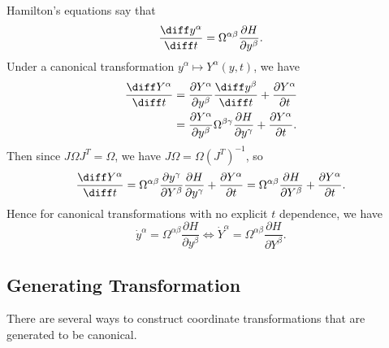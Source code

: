 \documentclass[12pt]{article}
\begin{document}
Hamilton's equations say that
\[
	\frac{\diff y^\alpha}{\diff t} = \Omega^{\alpha \beta} \frac{\partial H}{\partial y^{\beta}}.
\]
Under a canonical transformation $y^\alpha \mapsto Y^{\alpha}(y, t)$, we have
\begin{align*}
	\frac{\diff Y^{\alpha}}{\diff t} &= \frac{\partial Y^{\alpha}}{\partial y^{\beta}} \frac{\diff y^{\beta}}{\diff t} + \frac{\partial Y^{\alpha}}{\partial t} \\
					 &= \frac{\partial Y^{\alpha}}{\partial y^{\beta}} \Omega^{\beta \gamma} \frac{\partial H}{\partial y^{\gamma}} + \frac{\partial Y^{\alpha}}{\partial t}.
\end{align*}
Then since $J \Omega J^{T} = \Omega$, we have $J \Omega = \Omega (J^{T})^{-1}$, so
\[
\frac{\diff Y^{\alpha}}{\diff t} = \Omega^{\alpha \beta} \frac{\partial y^{\gamma}}{\partial Y^{\beta}} \frac{\partial H}{\partial y^{\gamma}} + \frac{\partial Y^{\alpha}}{\partial t} = \Omega^{\alpha \beta} \frac{\partial H}{\partial Y^{\beta}} + \frac{\partial Y^{\alpha}}{\partial t}.
\]
Hence for canonical transformations with no explicit $t$ dependence, we have
\[
\dot y^{\alpha} = \Omega^{\alpha \beta} \frac{\partial H}{\partial y^{\beta}} \iff \dot Y^{\alpha} = \Omega^{\alpha \beta} \frac{\partial H}{\partial Y^{\beta}}.
\]
\subsection{Generating Transformation}
\label{sub:gen_trans}

There are several ways to construct coordinate transformations that are generated to be canonical.
\end{document}
